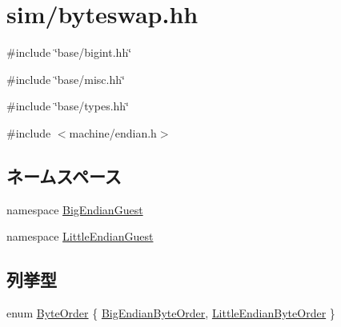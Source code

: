 \hypertarget{byteswap_8hh}{
\section{sim/byteswap.hh}
\label{byteswap_8hh}
}
{\ttfamily \#include \char`\"{}base/bigint.hh\char`\"{}}\par
{\ttfamily \#include \char`\"{}base/misc.hh\char`\"{}}\par
{\ttfamily \#include \char`\"{}base/types.hh\char`\"{}}\par
{\ttfamily \#include $<$machine/endian.h$>$}\par
\subsection*{ネームスペース}
\begin{DoxyCompactItemize}
\item 
namespace \hyperlink{namespaceBigEndianGuest}{BigEndianGuest}
\item 
namespace \hyperlink{namespaceLittleEndianGuest}{LittleEndianGuest}
\end{DoxyCompactItemize}
\subsection*{列挙型}
\begin{DoxyCompactItemize}
\item 
enum \hyperlink{byteswap_8hh_aaeb92d42f5a6e27b8ba19f18d69d142b}{ByteOrder} \{ \hyperlink{byteswap_8hh_aaeb92d42f5a6e27b8ba19f18d69d142baeb5880acff621b284760d4ed418de2ba}{BigEndianByteOrder}, 
\hyperlink{byteswap_8hh_aaeb92d42f5a6e27b8ba19f18d69d142ba27cb938a9a54fedfe5c69b927994bbef}{LittleEndianByteOrder}
 \}
\end{DoxyCompactItemize}
